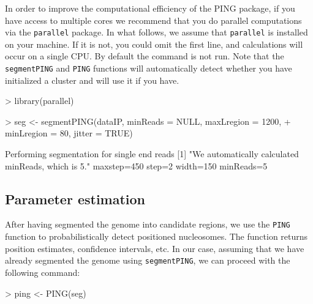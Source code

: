 \documentclass[11pt]{article}
\begin{document}
In order to improve the computational efficiency of the PING package, if you
have access to multiple cores we recommend that you do parallel computations via
the \texttt{parallel} package.
In what follows, we assume that \texttt{parallel} is installed on your machine.
If it is not, you could omit the first line, and calculations will occur on a
single CPU.
By default the command is not run. Note that the \texttt{segmentPING} and
\texttt{PING} functions will automatically detect whether you have initialized a
cluster and will use it if you have.

\begin{Schunk}
\begin{Sinput}
> library(parallel)
\end{Sinput}
\end{Schunk}


\begin{Schunk}
\begin{Sinput}
> seg <- segmentPING(dataIP, minReads = NULL, maxLregion = 1200, 
+     minLregion = 80, jitter = TRUE)
\end{Sinput}
\begin{Soutput}
Performing segmentation for single end reads
[1] "We automatically calculated minReads, which is 5."
maxstep=450
step=2
width=150
minReads=5
\end{Soutput}
\end{Schunk}


\subsection{Parameter estimation}
After having segmented the genome into candidate regions, we use the \texttt{PING} function to probabilistically detect positioned nucleosomes.
The function returns position estimates, confidence intervals, etc. %
In our case, assuming that we have already segmented the genome using \texttt{segmentPING}, we can proceed with the following command: 

\begin{Schunk}
\begin{Sinput}
> ping <- PING(seg)
\end{Sinput}
\end{Schunk}
\end{document}
